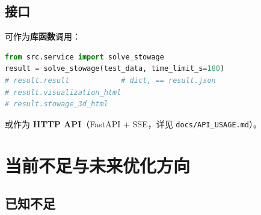 \documentclass[a4paper,11pt]{ctexart}
\begin{document}
\subsection{接口}

可作为\textbf{库函数}调用：
\begin{lstlisting}[language=Python]
from src.service import solve_stowage
result = solve_stowage(test_data, time_limit_s=180)
# result.result            # dict, == result.json
# result.visualization_html
# result.stowage_3d_html
\end{lstlisting}

或作为 \textbf{HTTP API}（FastAPI + SSE，详见 \texttt{docs/API\_USAGE.md}）。

\section{当前不足与未来优化方向}

\subsection{已知不足}
\end{document}
